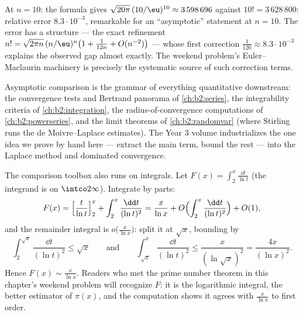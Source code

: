 \begin{example}\label{ex:b2:comparison:stirlingnum}
At $n = 10$: the formula gives $\sqrt{20\pi}\,(10/\eu)^{10}
\approx 3\,598\,696$ against $10! = 3\,628\,800$: relative error
$8.3\cdot10^{-3}$, remarkable for an ``asymptotic'' statement at
$n = 10$. The error has a structure --- the exact refinement $n!
= \sqrt{2\pi n}\,(n/\eu)^n\bigl(1 + \frac1{12n} +
O(n^{-2})\bigr)$ --- whose first correction $\frac1{120} \approx
8.3\cdot10^{-3}$ explains the observed gap almost exactly. The
weekend problem's Euler--Maclaurin machinery is precisely the
systematic source of such correction terms.
\end{example}

\begin{remark}
Asymptotic comparison is the grammar of everything quantitative
downstream: the convergence tests and Bertrand panorama of
\cref{ch:b2:series}, the integrability criteria of
\cref{ch:b2:integration}, the radius-of-convergence computations
of \cref{ch:b2:powerseries}, and the limit theorems of
\cref{ch:b2:randomvar} (where Stirling runs the de
Moivre--Laplace estimates). The Year 3 volume industrializes the
one idea we prove by hand here --- extract the main term, bound
the rest --- into the Laplace method and dominated convergence.
\end{remark}

\begin{example}\label{ex:b2:comparison:liworked}
The comparison toolbox also runs on integrals. Let $F(x) =
\int_2^x\frac{\dd t}{\ln t}$ (the integrand is  on
$\intco2\infty$). Integrate by parts:
\[
F(x) = \Bigl[\frac{t}{\ln t}\Bigr]_2^x +
\int_2^x\frac{\dd t}{(\ln t)^2}
= \frac{x}{\ln x} + O\Bigl(\int_2^x\frac{\dd t}{(\ln
t)^2}\Bigr) + O(1),
\]
and the remainder integral is $o\bigl(\frac{x}{\ln x}\bigr)$:
split it at $\sqrt x$, bounding by
\[
\int_2^{\sqrt x}\frac{\dd t}{(\ln t)^2} \leq \sqrt x
\qquad\text{and}\qquad
\int_{\sqrt x}^{x}\frac{\dd t}{(\ln t)^2} \leq
\frac{x}{(\ln\sqrt x)^2} = \frac{4x}{(\ln x)^2} .
\]
Hence $F(x) \sim \frac{x}{\ln x}$. Readers who met the prime
number theorem in this chapter's weekend problem will recognize
$F$: it is the logarithmic integral, the better estimator of
$\pi(x)$, and the computation shows it agrees with
$\frac{x}{\ln x}$ to first order.
\end{example}


